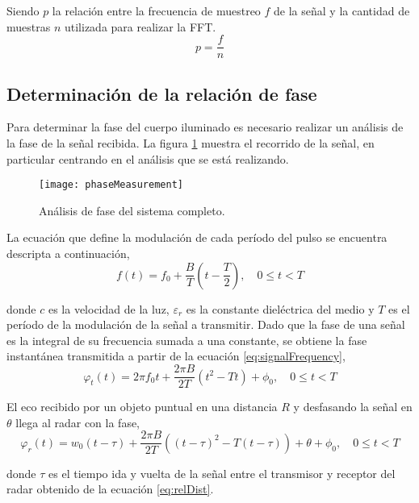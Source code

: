 Siendo $p$ la relación entre la frecuencia de muestreo $f$ de la señal y la cantidad de muestras $n$ utilizada para realizar la FFT.
\begin{equation}
  p = \frac{f}{n}
\end{equation}


\subsection{Determinación de la relación de fase}

Para determinar la fase del cuerpo iluminado es necesario realizar un análisis de la fase de la señal recibida. La figura \ref{fig:phaseSystem} muestra el recorrido de la señal, en particular centrando en el análisis que se está realizando.
\begin{figure}[htb]
 \centering
 \texttt{[image: phaseMeasurement]}
 \caption{Análisis de fase del sistema completo.}
 \label{fig:phaseSystem}
\end{figure}

La ecuación que define la modulación de cada período del pulso se encuentra descripta a continuación,
\begin{equation}
  f(t) = f_0 + \dfrac{B}{T}(t-\dfrac{T}{2}),\quad 0 \le t < T
  \label{eq:signalFrequency}
\end{equation}

donde $c$ es la velocidad de la luz, $\varepsilon_r$ es la constante dieléctrica del medio \cite{Brennan2014a} y $T$ es el período de la modulación de la señal a transmitir. Dado que la fase de una señal es la integral de su frecuencia sumada a una constante, se obtiene la fase instantánea transmitida a partir de la ecuación \ref{eq:signalFrequency},
\begin{equation}
  \varphi_t(t) = 2\pi f_0t + \dfrac{2\pi B}{2T}(t^2-Tt) + \phi_0,\quad 0 \le t < T
  \label{eq:signalFrequency2}
\end{equation}

El eco recibido por un objeto puntual en una distancia $R$ y desfasando la señal en $\theta$ llega al radar con la fase,
\begin{equation}
  \varphi_r(t) = w_0(t-\tau) + \dfrac{2\pi B}{2T}((t - \tau)^2-T(t - \tau)) + \theta + \phi_0,\quad 0 \le t < T
  \label{eq:signalFrequency3}
\end{equation}

donde $\tau$ es el tiempo ida y vuelta de la señal entre el transmisor y receptor del radar obtenido de la ecuación \ref{eq:relDist}.

